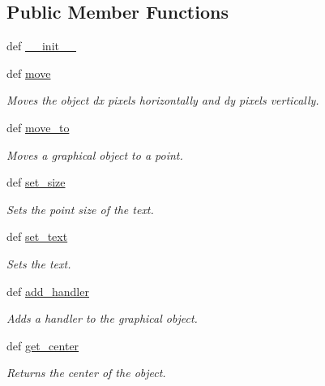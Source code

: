 \subsection*{Public Member Functions}
\begin{DoxyCompactItemize}
\item 
def \hyperlink{classcs110graphics_1_1Text_a022ce78a2945edbd8dfe3c4498769a62}{\_\-\_\-init\_\-\_\-}
\item 
def \hyperlink{classcs110graphics_1_1Text_a6bd6f174fc82f2225a4d162ca6b90ec2}{move}
\begin{DoxyCompactList}\small\item\em Moves the object dx pixels horizontally and dy pixels vertically. \item\end{DoxyCompactList}\item 
def \hyperlink{classcs110graphics_1_1Text_a615a76c8d2edd6c6af5d39d4e2577a27}{move\_\-to}
\begin{DoxyCompactList}\small\item\em Moves a graphical object to a point. \item\end{DoxyCompactList}\item 
def \hyperlink{classcs110graphics_1_1Text_ad470aa26235fc2f5f1459c3750251207}{set\_\-size}
\begin{DoxyCompactList}\small\item\em Sets the point size of the text. \item\end{DoxyCompactList}\item 
def \hyperlink{classcs110graphics_1_1Text_ab12aa7478ca6a2b2015b7e8544674c73}{set\_\-text}
\begin{DoxyCompactList}\small\item\em Sets the text. \item\end{DoxyCompactList}\item 
def \hyperlink{classcs110graphics_1_1GraphicalObject_adb1af0d5a6baae3f9a08d21a3227c49f}{add\_\-handler}
\begin{DoxyCompactList}\small\item\em Adds a handler to the graphical object. \item\end{DoxyCompactList}\item 
def \hyperlink{classcs110graphics_1_1GraphicalObject_a062789c4cc9de38af32dcc4ff2058607}{get\_\-center}
\begin{DoxyCompactList}\small\item\em Returns the center of the object. \item\end{DoxyCompactList}\item 

\end{DoxyCompactItemize}
